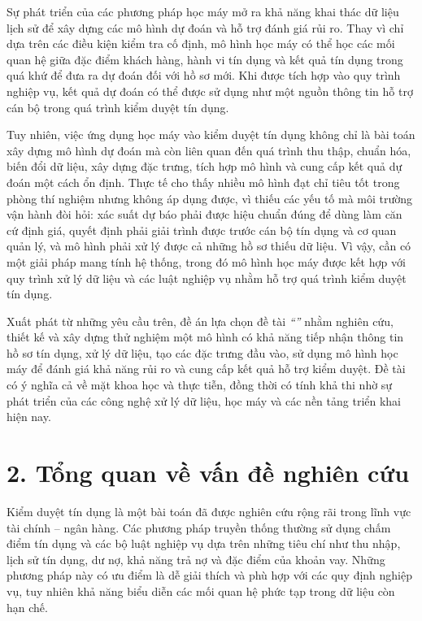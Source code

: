 Sự phát triển của các phương pháp học máy mở ra khả năng khai thác dữ liệu lịch
sử để xây dựng các mô hình dự đoán và hỗ trợ đánh giá rủi ro. Thay vì chỉ dựa
trên các điều kiện kiểm tra cố định, mô hình học máy có thể học các mối quan hệ
giữa đặc điểm khách hàng, hành vi tín dụng và kết quả tín dụng trong quá khứ để
đưa ra dự đoán đối với hồ sơ mới. Khi được tích hợp vào quy trình nghiệp vụ, kết
quả dự đoán có thể được sử dụng như một nguồn thông tin hỗ trợ cán bộ trong quá
trình kiểm duyệt tín dụng.

Tuy nhiên, việc ứng dụng học máy vào kiểm duyệt tín dụng không chỉ là bài toán
xây dựng mô hình dự đoán mà còn liên quan đến quá trình thu thập, chuẩn hóa, biến
đổi dữ liệu, xây dựng đặc trưng, tích hợp mô hình và cung cấp kết quả dự đoán một
cách ổn định. Thực tế cho thấy nhiều mô hình đạt chỉ tiêu tốt trong phòng thí
nghiệm nhưng không áp dụng được, vì thiếu các yếu tố mà môi trường vận hành đòi
hỏi: xác suất dự báo phải được hiệu chuẩn đúng để dùng làm căn cứ định giá, quyết
định phải giải trình được trước cán bộ tín dụng và cơ quan quản lý, và mô hình
phải xử lý được cả những hồ sơ thiếu dữ liệu. Vì vậy, cần có một giải pháp mang
tính hệ thống, trong đó mô hình học máy được kết hợp với quy trình xử lý dữ liệu
và các luật nghiệp vụ nhằm hỗ trợ quá trình kiểm duyệt tín dụng.

Xuất phát từ những yêu cầu trên, đề án lựa chọn đề tài
\textit{``\thesisTitle''} nhằm nghiên cứu, thiết kế và xây dựng thử nghiệm một mô
hình có khả năng tiếp nhận thông tin hồ sơ tín dụng, xử lý dữ liệu, tạo các đặc
trưng đầu vào, sử dụng mô hình học máy để đánh giá khả năng rủi ro và cung cấp
kết quả hỗ trợ kiểm duyệt. Đề tài có ý nghĩa cả về mặt khoa học và thực tiễn,
đồng thời có tính khả thi nhờ sự phát triển của các công nghệ xử lý dữ liệu, học
máy và các nền tảng triển khai hiện nay.

\section*{2. Tổng quan về vấn đề nghiên cứu}

Kiểm duyệt tín dụng là một bài toán đã được nghiên cứu rộng rãi trong lĩnh vực
tài chính -- ngân hàng. Các phương pháp truyền thống thường sử dụng chấm điểm tín
dụng và các bộ luật nghiệp vụ dựa trên những tiêu chí như thu nhập, lịch
sử tín dụng, dư nợ, khả năng trả nợ và đặc điểm của khoản vay. Những phương pháp
này có ưu điểm là dễ giải thích và phù hợp với các quy định nghiệp vụ, tuy nhiên
khả năng biểu diễn các mối quan hệ phức tạp trong dữ liệu còn hạn chế.

